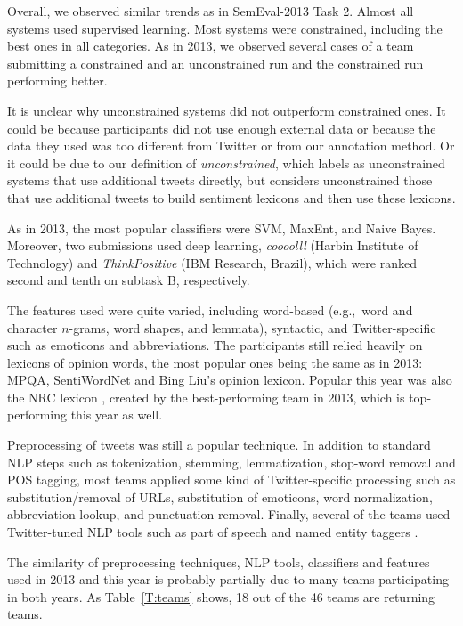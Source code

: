 \documentclass[11pt]{article}
\begin{document}
Overall, we observed similar trends as in SemEval-2013 Task 2.
Almost all systems used supervised learning.
Most systems were constrained, including the best ones in all categories.
As in 2013, we observed several cases of a team submitting a constrained
and an unconstrained run and the constrained run performing better.

It is unclear why unconstrained systems did not outperform constrained ones.
It could be because participants did not use enough external data
or because the data they used was too different from Twitter or from our annotation method.
Or it could be due to our definition of \emph{unconstrained},
which labels as unconstrained systems that use additional tweets directly,
but considers unconstrained those that use additional tweets to build sentiment lexicons and then use these lexicons.

As in 2013, the most popular classifiers were SVM, MaxEnt, and Naive Bayes.
Moreover, two submissions used deep learning,
\emph{coooolll} (Harbin Institute of Technology) and \emph{ThinkPositive} (IBM Research, Brazil),
which were ranked second and tenth on subtask B, respectively.

The features used were quite varied, including word-based
(e.g.,~word and character $n$-grams, word shapes, and lemmata),
syntactic, and Twitter-specific such as emoticons and abbreviations.
The participants still relied heavily on lexicons of opinion words,
the most popular ones being the same as in 2013: MPQA, SentiWordNet and Bing Liu's opinion lexicon.
Popular this year was also the NRC lexicon \cite{MohammadKZ2013},
created by the best-performing team in 2013,
which is top-performing this year as well.

Preprocessing of tweets was still a popular technique. In addition to standard NLP steps such as tokenization, stemming, lemmatization, stop-word removal and POS tagging, most teams applied some kind of Twitter-specific processing such as substitution/removal of URLs, substitution of emoticons, word normalization, abbreviation lookup, and punctuation removal. Finally, several of the teams used Twitter-tuned NLP tools such as part of speech and named entity taggers \cite{gimpel2011,ner}.

The similarity of preprocessing techniques, NLP tools, classifiers and features used
in 2013 and this year is probably partially due to many teams participating in both years.
As Table~\ref{T:teams} shows, 18 out of the 46 teams are returning teams.
\end{document}
